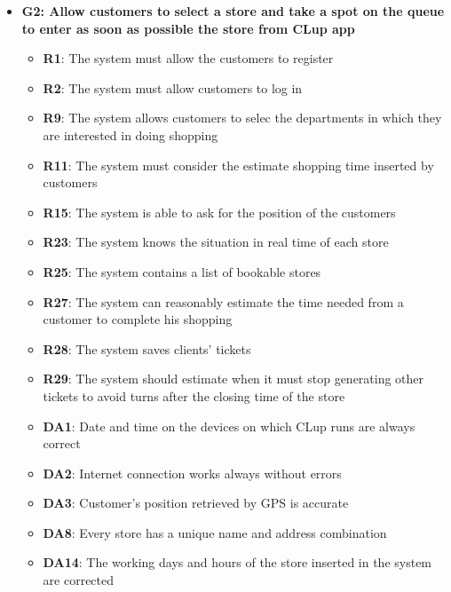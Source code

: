 \documentclass{article}
\begin{document}
\begin{itemize}
\begin{itemize}
					\end{itemize}
				
				\item {\bfseries G2: Allow customers to select a store and take a spot on the queue to enter as soon as possible the store from CLup app}	

					\begin{itemize}
						
						\item {\bfseries R1}: The system must allow the customers to register
						\item {\bfseries R2}: The system must allow customers to log in
						\item {\bfseries R9}: The system allows customers to selec the departments in which they are interested in doing shopping							\item {\bfseries R11}: The system must consider the estimate shopping time inserted by customers
						\item {\bfseries R15}: The system is able to ask for the position of the customers
						\item {\bfseries R23}: The system knows the situation in real time of each store
						\item {\bfseries R25}: The system contains a list of bookable stores
						\item {\bfseries R27}: The system can reasonably estimate the time needed from a customer to complete his shopping
						\item {\bfseries R28}: The system saves clients' tickets
						\item {\bfseries R29}: The system should estimate when it must stop generating other tickets to avoid turns after the closing time of the store \\
		
						\item {\bfseries DA1}: Date and time on the devices on which CLup runs are always correct
						\item {\bfseries DA2}: Internet connection works always without errors
						\item {\bfseries DA3}: Customer’s position retrieved by GPS is accurate
						\item {\bfseries DA8}: Every store has a unique name and address combination
						\item {\bfseries DA14}: The working days and hours of the store inserted in the system are corrected
						
					\end{itemize}


\end{itemize}
\end{document}

